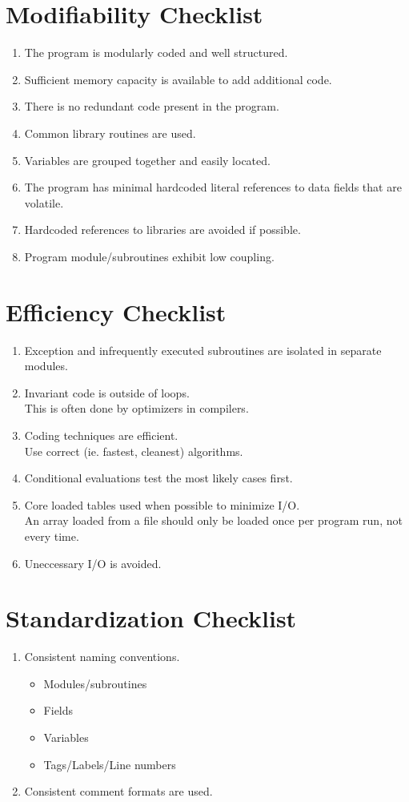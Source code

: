  \section {Modifiability Checklist}
 \begin{enumerate}
  \item The program is modularly coded and well structured.
  \item Sufficient memory capacity is available to add additional code.
  \item There is no redundant code present in the program.
  \item Common library routines are used.
  \item Variables are grouped together and easily located.
  \item The program has minimal hardcoded literal references to data fields
    that are volatile.
  \item Hardcoded references to libraries are avoided if possible.
  \item Program module/subroutines exhibit low coupling.
 \end{enumerate}
 \section {Efficiency Checklist}
 \begin{enumerate}
  \item Exception and infrequently executed subroutines are isolated in
    separate modules.
  \item Invariant code is outside of loops.\\[.1in]
    This is often done by optimizers in compilers.
  \item Coding techniques are efficient.\\[.1in]
    Use correct (ie. fastest, cleanest) algorithms.
  \item Conditional evaluations test the most likely cases first.
  \item Core loaded tables used when possible to minimize I/O.\\[.1in]
    An array loaded from a file should only be loaded once per program
    run, not every time.
  \item Uneccessary I/O is avoided.
 \end{enumerate}
 \section {Standardization Checklist}
 \begin{enumerate}
  \item Consistent naming conventions.
  \begin{itemize}
   \item Modules/subroutines
   \item Fields
   \item Variables
   \item Tags/Labels/Line numbers
  \end{itemize}
  \item Consistent comment formats are used.
 \end{enumerate}
